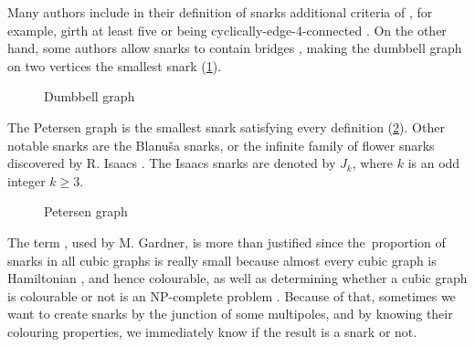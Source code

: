 Many authors include in their definition of snarks additional criteria of , for example, girth at least five or being cyclically-edge-4-connected \cite{Preissmann1983, Nedela1996}. On the other hand, some authors allow snarks to contain bridges \cite{IrreducibleSnarksSkoviera}, making the dumbbell graph on two vertices the smallest snark (\cref{fig:dumbbell}).

\begin{figure}
	\centering
	
	\caption{Dumbbell graph}
	\label{fig:dumbbell}
\end{figure}

The Petersen graph is the smallest snark satisfying every definition (\cref{fig:petersen}). Other notable snarks are the Blanuša snarks, or the infinite family of flower snarks discovered by R. Isaacs \cite{Isaacs1975}. The Isaacs snarks are denoted by $J_k$, where $k$ is an odd integer $k\geq 3$.

\begin{figure}
	\centering
	
	\caption{Petersen graph}
	\label{fig:petersen}
\end{figure}

The term , used by M. Gardner, is more than justified since the~proportion of snarks in all cubic graphs is really small because almost every cubic graph is Hamiltonian \cite{Robinson1992}, and hence colourable, as well as determining whether a cubic graph is colourable or not is an NP-complete problem \cite{HolyerNP}. Because of that, sometimes we want to create snarks by the junction of some multipoles, and by knowing their colouring properties, we immediately know if the result is a snark or not.
